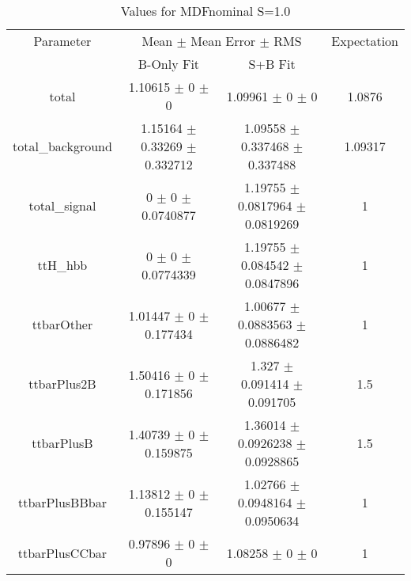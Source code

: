 \begin{table}
\centering
\caption{Values for MDFnominal S=1.0}
\begin{tabular}{cccc}
\toprule
Parameter & \multicolumn{2}{c}{Mean $\pm$ Mean Error $\pm$ RMS} & Expectation\\
 & B-Only Fit & S+B Fit & \\
\midrule
total & \num{1.10615} $\pm$ \num{0} $\pm$ \num{0} & \num{1.09961} $\pm$ \num{0} $\pm$ \num{0} & \num{1.0876}\\
total\_background & \num{1.15164} $\pm$ \num{0.33269} $\pm$ \num{0.332712} & \num{1.09558} $\pm$ \num{0.337468} $\pm$ \num{0.337488} & \num{1.09317}\\
total\_signal & \num{0} $\pm$ \num{0} $\pm$ \num{0.0740877} & \num{1.19755} $\pm$ \num{0.0817964} $\pm$ \num{0.0819269} & \num{1}\\
ttH\_hbb & \num{0} $\pm$ \num{0} $\pm$ \num{0.0774339} & \num{1.19755} $\pm$ \num{0.084542} $\pm$ \num{0.0847896} & \num{1}\\
ttbarOther & \num{1.01447} $\pm$ \num{0} $\pm$ \num{0.177434} & \num{1.00677} $\pm$ \num{0.0883563} $\pm$ \num{0.0886482} & \num{1}\\
ttbarPlus2B & \num{1.50416} $\pm$ \num{0} $\pm$ \num{0.171856} & \num{1.327} $\pm$ \num{0.091414} $\pm$ \num{0.091705} & \num{1.5}\\
ttbarPlusB & \num{1.40739} $\pm$ \num{0} $\pm$ \num{0.159875} & \num{1.36014} $\pm$ \num{0.0926238} $\pm$ \num{0.0928865} & \num{1.5}\\
ttbarPlusBBbar & \num{1.13812} $\pm$ \num{0} $\pm$ \num{0.155147} & \num{1.02766} $\pm$ \num{0.0948164} $\pm$ \num{0.0950634} & \num{1}\\
ttbarPlusCCbar & \num{0.97896} $\pm$ \num{0} $\pm$ \num{0} & \num{1.08258} $\pm$ \num{0} $\pm$ \num{0} & \num{1}\\
\bottomrule
\end{tabular}
\end{table}